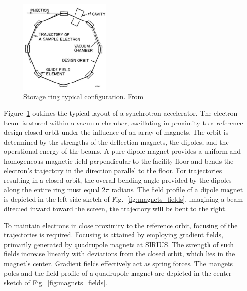 \begin{figure}[tb]
    \centering
    \includegraphics[width=0.4\textwidth]{Images/storage_ring.png}
    \caption{Storage ring typical configuration. From \cite{sands_physics_1969}}
    \label{fig:storage_ring}
\end{figure}
Figure~\ref{fig:storage_ring} outlines the typical layout of a synchrotron accelerator. The electron beam is stored within a vacuum chamber, oscillating in proximity to a reference design closed orbit under the influence of an array of magnets. The orbit is determined by the strengths of the deflection magnets, the dipoles, and the operational energy of the beams. A pure dipole magnet provides a uniform and homogeneous magnetic field perpendicular to the facility floor and bends the electron's trajectory in the direction parallel to the floor. For trajectories resulting in a closed orbit, the overall bending angle provided by the dipoles along the entire ring must equal $2\pi$ radians. The field profile of a dipole magnet is depicted in the left-side sketch of Fig.~\ref{fig:magnets_fields}. Imagining a beam directed inward toward the screen, the trajectory will be bent to the right.

To maintain electrons in close proximity to the reference orbit, focusing of the trajectories is required. Focusing is attained by employing gradient fields, primarily generated by quadrupole magnets at SIRIUS. The strength of such fields increase linearly with deviations from the closed orbit, which lies in the magnet's center. Gradient fields effectively act as spring forces. The mangets poles and the field profile of a quadrupole magnet are depicted in the center sketch of Fig.~\ref{fig:magnets_fields}.

